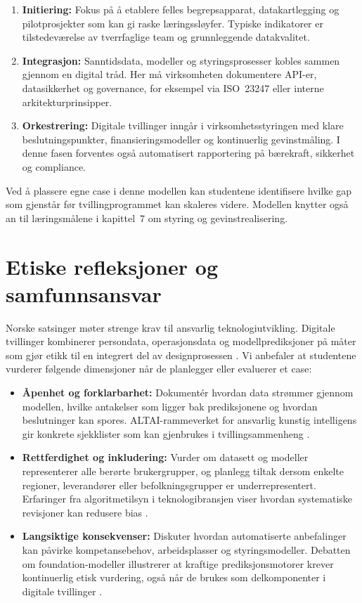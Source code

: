 \begin{enumerate}
    \item \textbf{Initiering:} Fokus på å etablere felles begrepsapparat, datakartlegging og pilotprosjekter som kan gi raske læringssløyfer. Typiske indikatorer er tilstedeværelse av tverrfaglige team og grunnleggende datakvalitet.
    \item \textbf{Integrasjon:} Sanntidsdata, modeller og styringsprosesser kobles sammen gjennom en digital tråd. Her må virksomheten dokumentere API-er, datasikkerhet og governance, for eksempel via ISO~23247 eller interne arkitekturprinsipper.
    \item \textbf{Orkestrering:} Digitale tvillinger inngår i virksomhetsstyringen med klare beslutningspunkter, finansieringsmodeller og kontinuerlig gevinstmåling. I denne fasen forventes også automatisert rapportering på bærekraft, sikkerhet og compliance.
\end{enumerate}

Ved å plassere egne case i denne modellen kan studentene identifisere hvilke gap som gjenstår før tvillingprogrammet kan skaleres videre. Modellen knytter også an til læringsmålene i kapittel~7 om styring og gevinstrealisering.

\section{Etiske refleksjoner og samfunnsansvar}
Norske satsinger møter strenge krav til ansvarlig teknologiutvikling. Digitale tvillinger kombinerer persondata, operasjonsdata og modellprediksjoner på måter som gjør etikk til en integrert del av designprosessen \citep{regjeringen2022datastrategi}. Vi anbefaler at studentene vurderer følgende dimensjoner når de planlegger eller evaluerer et case:

\begin{itemize}
    \item \textbf{Åpenhet og forklarbarhet:} Dokumentér hvordan data strømmer gjennom modellen, hvilke antakelser som ligger bak prediksjonene og hvordan beslutninger kan spores. ALTAI-rammeverket for ansvarlig kunstig intelligens gir konkrete sjekklister som kan gjenbrukes i tvillingsammenheng \citep{ec2020trustworthyai}.
    \item \textbf{Rettferdighet og inkludering:} Vurder om datasett og modeller representerer alle berørte brukergrupper, og planlegg tiltak dersom enkelte regioner, leverandører eller befolkningsgrupper er underrepresentert. Erfaringer fra algoritmetilsyn i teknologibransjen viser hvordan systematiske revisjoner kan redusere bias \citep{raji2020closing}.
    \item \textbf{Langsiktige konsekvenser:} Diskuter hvordan automatiserte anbefalinger kan påvirke kompetansebehov, arbeidsplasser og styringsmodeller. Debatten om foundation-modeller illustrerer at kraftige prediksjonsmotorer krever kontinuerlig etisk vurdering, også når de brukes som delkomponenter i digitale tvillinger \citep{bommasani2021opportunities}.
\end{itemize}

